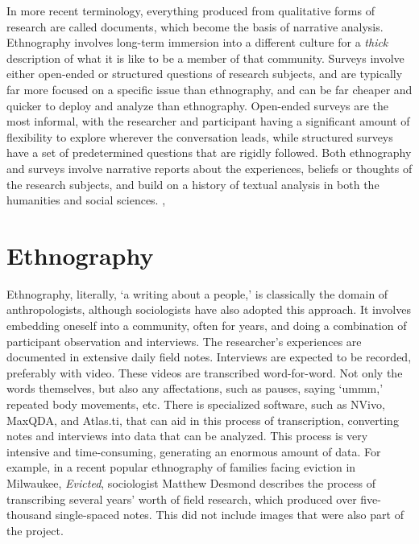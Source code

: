 \documentclass[sigconf]{acmart}
\begin{document}
In more recent terminology, everything produced from qualitative forms of research are called documents, which become the basis of narrative analysis.  Ethnography involves long-term immersion into a different culture for a {\em thick} description of what it is like to be a member of that community.  Surveys involve either open-ended or structured questions of research subjects, and are typically far more focused on a specific issue than ethnography, and can be far cheaper and quicker to deploy and analyze than ethnography.  Open-ended surveys are the most informal, with the researcher and participant having a significant amount of flexibility to explore wherever the conversation leads, while structured surveys have a set of predetermined questions that are rigidly followed.  Both ethnography and surveys involve narrative reports about the experiences, beliefs or thoughts of the research subjects, and build on a history of textual analysis in both the humanities and social sciences. \cite{bryman16}, \cite{singleton18}

\section{Ethnography}
Ethnography, literally, `a writing about a people,' is classically the domain of anthropologists, although sociologists have also adopted this approach.  It involves embedding oneself into a community, often for years, and doing a combination of participant observation and interviews.  The researcher's experiences are documented in extensive daily field notes.  Interviews are expected to be recorded, preferably with video.  These videos are transcribed word-for-word.  Not only the words themselves, but also any affectations, such as pauses, saying `ummm,' repeated body movements, etc.  There is specialized software, such as NVivo, MaxQDA, and Atlas.ti, that can aid in this process of transcription, converting notes and interviews into data that can be analyzed. \cite{hand14} This process is very intensive and time-consuming, generating an enormous amount of data.  For example, in a recent popular ethnography of families facing eviction in Milwaukee, {\em Evicted}, sociologist Matthew Desmond describes the process of transcribing several years' worth of field research, which produced over five-thousand single-spaced notes.  \cite{desmond16}  This did not include images that were also part of the project.  
\end{document}
